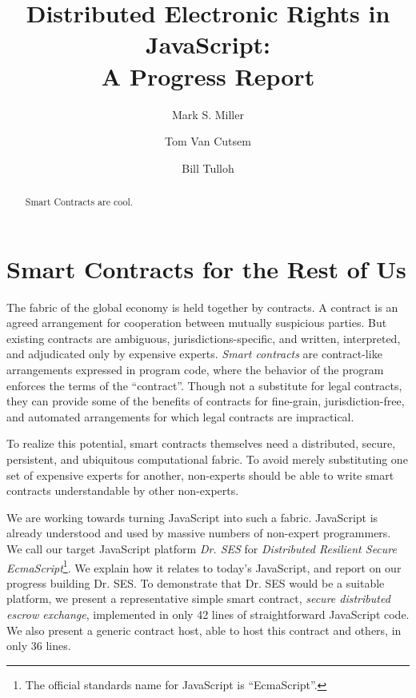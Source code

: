 \documentclass{llncs}
\begin{document}
\sloppypar


\title{Distributed Electronic Rights in JavaScript:\\
A Progress Report}

\author{Mark S. Miller \and Tom Van Cutsem \and Bill Tulloh }


\maketitle    

\begin{abstract}

Smart Contracts are cool. 

\end{abstract}

\section{Smart Contracts for the Rest of Us}

The fabric of the global economy is held together by contracts. A contract is an agreed arrangement for cooperation between mutually suspicious parties. But existing contracts are ambiguous, jurisdictions-specific, and written, interpreted, and adjudicated only by expensive experts. \emph{Smart contracts} are contract-like arrangements expressed in program code, where the behavior of the program enforces the terms of the ``contract''\cite{szabo1997formalizing}. Though not a substitute for legal contracts, they can provide some of the benefits of contracts for fine-grain, jurisdiction-free, and automated arrangements for which legal contracts are impractical.

To realize this potential, smart contracts themselves need a distributed, secure, persistent, and ubiquitous computational fabric. To avoid merely substituting one set of expensive experts for another, non-experts should be able to write smart contracts understandable by other non-experts.

We are working towards turning JavaScript into such a fabric. JavaScript is already understood and used by massive numbers of non-expert programmers. We call our target JavaScript platform \emph{Dr. SES} for \emph{Distributed Resilient Secure EcmaScript}\footnote{The official standards name for JavaScript is ``EcmaScript''.}. We explain how it relates to today's JavaScript, and report on our progress building Dr. SES. To demonstrate that Dr. SES would be a suitable platform, we present a representative simple smart contract, \emph{secure distributed escrow exchange}, implemented in only 42 lines of straightforward JavaScript code. We also present a generic contract host, able to host this contract and others, in only 36 lines.
\end{document}
